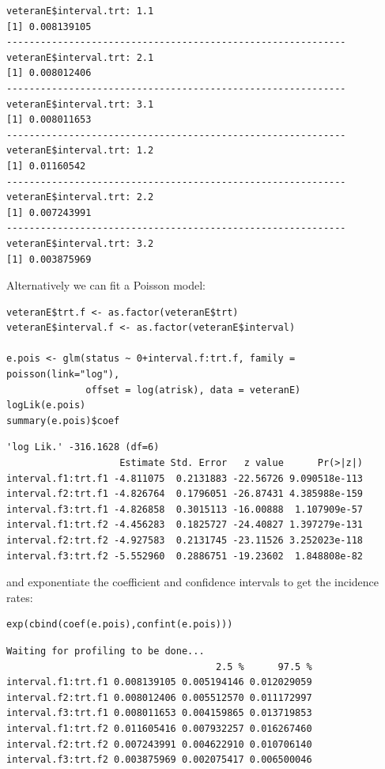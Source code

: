 \documentclass{article}
\begin{document}
\begin{verbatim}
veteranE$interval.trt: 1.1
[1] 0.008139105
------------------------------------------------------------ 
veteranE$interval.trt: 2.1
[1] 0.008012406
------------------------------------------------------------ 
veteranE$interval.trt: 3.1
[1] 0.008011653
------------------------------------------------------------ 
veteranE$interval.trt: 1.2
[1] 0.01160542
------------------------------------------------------------ 
veteranE$interval.trt: 2.2
[1] 0.007243991
------------------------------------------------------------ 
veteranE$interval.trt: 3.2
[1] 0.003875969
\end{verbatim}

Alternatively we can fit a Poisson model:
\lstset{language=r,label= ,caption= ,captionpos=b,numbers=none}
\begin{lstlisting}
veteranE$trt.f <- as.factor(veteranE$trt)
veteranE$interval.f <- as.factor(veteranE$interval)

e.pois <- glm(status ~ 0+interval.f:trt.f, family = poisson(link="log"),
              offset = log(atrisk), data = veteranE)
logLik(e.pois)
summary(e.pois)$coef
\end{lstlisting}

\begin{verbatim}
'log Lik.' -316.1628 (df=6)
                    Estimate Std. Error   z value      Pr(>|z|)
interval.f1:trt.f1 -4.811075  0.2131883 -22.56726 9.090518e-113
interval.f2:trt.f1 -4.826764  0.1796051 -26.87431 4.385988e-159
interval.f3:trt.f1 -4.826858  0.3015113 -16.00888  1.107909e-57
interval.f1:trt.f2 -4.456283  0.1825727 -24.40827 1.397279e-131
interval.f2:trt.f2 -4.927583  0.2131745 -23.11526 3.252023e-118
interval.f3:trt.f2 -5.552960  0.2886751 -19.23602  1.848808e-82
\end{verbatim}


and exponentiate the coefficient and confidence intervals to get the incidence rates:
\lstset{language=r,label= ,caption= ,captionpos=b,numbers=none}
\begin{lstlisting}
exp(cbind(coef(e.pois),confint(e.pois)))
\end{lstlisting}

\begin{verbatim}
Waiting for profiling to be done...
                                     2.5 %      97.5 %
interval.f1:trt.f1 0.008139105 0.005194146 0.012029059
interval.f2:trt.f1 0.008012406 0.005512570 0.011172997
interval.f3:trt.f1 0.008011653 0.004159865 0.013719853
interval.f1:trt.f2 0.011605416 0.007932257 0.016267460
interval.f2:trt.f2 0.007243991 0.004622910 0.010706140
interval.f3:trt.f2 0.003875969 0.002075417 0.006500046
\end{verbatim}
\end{document}
